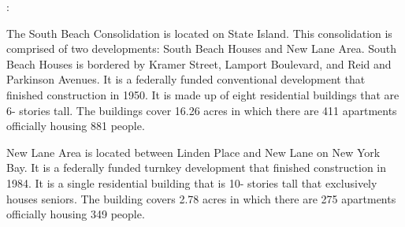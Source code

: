 :      

    

The South Beach Consolidation is located on State Island. This consolidation is comprised of two developments: South Beach Houses and New Lane Area. South Beach Houses is bordered by Kramer Street, Lamport Boulevard, and Reid and Parkinson Avenues. It is a federally funded conventional development that finished construction in 1950. It is made up of eight residential buildings that are 6- stories tall. The buildings cover 16.26 acres in which there are 411 apartments officially housing 881 people.  

New Lane Area is located between Linden Place and New Lane on New York Bay. It is a federally funded turnkey development that finished construction in 1984. It is a single residential building that is 10- stories tall that exclusively houses seniors. The building covers 2.78 acres in which there are 275 apartments officially housing 349 people.  